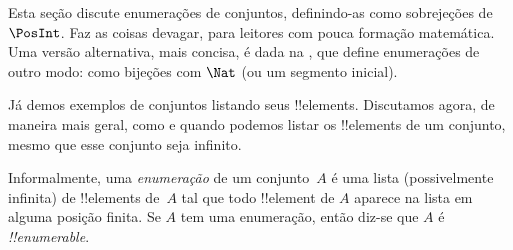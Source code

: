 \documentclass[../../../include/open-logic-section]{subfiles}
\begin{document}


\begin{editorial}
  Esta seção discute enumerações de conjuntos, definindo-as como
  sobrejeções de $\PosInt$. Faz as coisas devagar, para leitores com
  pouca formação matemática. Uma versão alternativa, mais concisa,
  é dada na , que define enumerações
  de outro modo: como bijeções com $\Nat$ (ou um segmento inicial).
\end{editorial}

\begin{explain}
Já demos exemplos de conjuntos listando seus !!{element}s.
Discutamos agora, de maneira mais geral, como e quando podemos listar os
!!{element}s de um conjunto, mesmo que esse conjunto seja infinito.
\end{explain}

\begin{defn}
Informalmente, uma \emph{enumeração} de um conjunto~$A$ é uma lista (possivelmente
infinita) de !!{element}s de~$A$ tal que todo !!{element} de $A$
aparece na lista em alguma posição finita. Se $A$ tem uma
enumeração, então diz-se que $A$ é \emph{!!{enumerable}}.
\end{defn}
\end{document}
